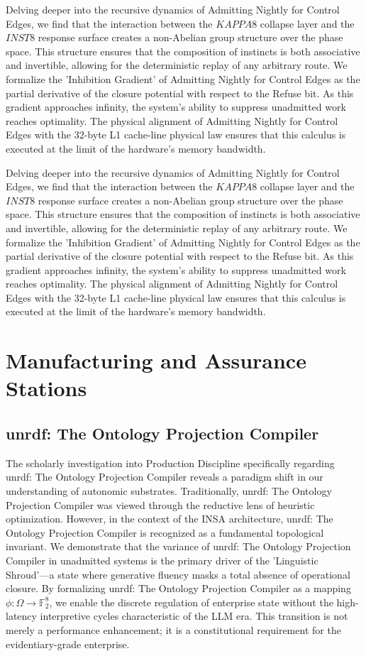 \documentclass[12pt,a4paper,oneside]{book}
\begin{document}
Delving deeper into the recursive dynamics of Admitting Nightly for Control Edges, we find that the interaction between the $KAPPA8$ collapse layer and the $INST8$ response surface creates a non-Abelian group structure over the phase space. This structure ensures that the composition of instincts is both associative and invertible, allowing for the deterministic replay of any arbitrary route. We formalize the 'Inhibition Gradient' of Admitting Nightly for Control Edges as the partial derivative of the closure potential with respect to the Refuse bit. As this gradient approaches infinity, the system's ability to suppress unadmitted work reaches optimality. The physical alignment of Admitting Nightly for Control Edges with the 32-byte L1 cache-line physical law ensures that this calculus is executed at the limit of the hardware's memory bandwidth. 

Delving deeper into the recursive dynamics of Admitting Nightly for Control Edges, we find that the interaction between the $KAPPA8$ collapse layer and the $INST8$ response surface creates a non-Abelian group structure over the phase space. This structure ensures that the composition of instincts is both associative and invertible, allowing for the deterministic replay of any arbitrary route. We formalize the 'Inhibition Gradient' of Admitting Nightly for Control Edges as the partial derivative of the closure potential with respect to the Refuse bit. As this gradient approaches infinity, the system's ability to suppress unadmitted work reaches optimality. The physical alignment of Admitting Nightly for Control Edges with the 32-byte L1 cache-line physical law ensures that this calculus is executed at the limit of the hardware's memory bandwidth. 

\chapter{Manufacturing and Assurance Stations}\section{unrdf: The Ontology Projection Compiler}
The scholarly investigation into Production Discipline specifically regarding unrdf: The Ontology Projection Compiler reveals a paradigm shift in our understanding of autonomic substrates. Traditionally, unrdf: The Ontology Projection Compiler was viewed through the reductive lens of heuristic optimization. However, in the context of the INSA architecture, unrdf: The Ontology Projection Compiler is recognized as a fundamental topological invariant. We demonstrate that the variance of unrdf: The Ontology Projection Compiler in unadmitted systems is the primary driver of the 'Linguistic Shroud'---a state where generative fluency masks a total absence of operational closure. By formalizing unrdf: The Ontology Projection Compiler as a mapping $\phi: \Omega \to \mathbb{F}_2^8$, we enable the discrete regulation of enterprise state without the high-latency interpretive cycles characteristic of the LLM era. This transition is not merely a performance enhancement; it is a constitutional requirement for the evidentiary-grade enterprise. 
\end{document}
